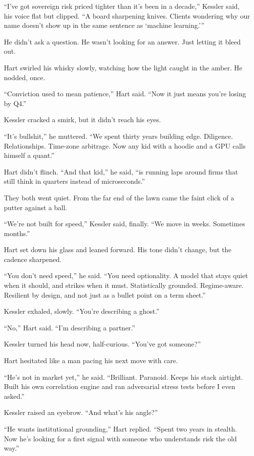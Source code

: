 “I’ve got sovereign risk priced tighter than it’s been in a decade,” Kessler said, his voice flat but clipped. “A board 
sharpening knives. Clients wondering why our name doesn’t show up in the same sentence as ‘machine learning.’”

He didn’t ask a question. He wasn’t looking for an answer. Just letting it bleed out.

Hart swirled his whisky slowly, watching how the light caught in the amber. He nodded, once.

“Conviction used to mean patience,” Hart said. “Now it just means you’re losing by Q4.”

Kessler cracked a smirk, but it didn’t reach his eyes.

“It’s bullshit,” he muttered. “We spent thirty years building edge. Diligence. Relationships. Time-zone 
arbitrage.  Now any kid with a hoodie and a GPU calls himself a quant.”

Hart didn’t flinch. “And that kid,” he said, “is running laps around firms that still think in quarters instead 
of microseconds.”

They both went quiet. From the far end of the lawn came the faint click of a putter against a ball.

“We’re not built for speed,” Kessler said, finally. “We move in weeks. Sometimes months.”

Hart set down his glass and leaned forward. His tone didn’t change, but the cadence sharpened.

“You don’t need speed,” he said. “You need optionality. A model that stays quiet when it should, and strikes 
when it must. Statistically grounded. Regime-aware. Resilient by design, and not just as a bullet point on 
a term sheet.”

Kessler exhaled, slowly. “You’re describing a ghost.”

“No,” Hart said. “I’m describing a partner.”

Kessler turned his head now, half-curious. “You’ve got someone?”

Hart hesitated like a man pacing his next move with care.

“He’s not in market yet,” he said. “Brilliant. Paranoid. Keeps his stack airtight. Built his own correlation 
engine and ran adversarial stress tests before I even asked.”

Kessler raised an eyebrow. “And what’s his angle?”

“He wants institutional grounding,” Hart replied. “Spent two years in stealth. Now he’s looking for a first 
signal with someone who understands risk the old way.”

